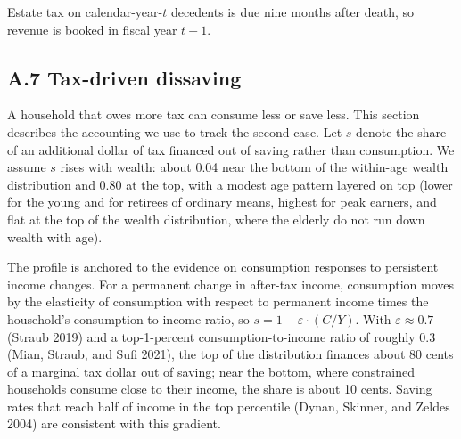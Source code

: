 \documentclass[10pt,twocolumn]{article}
\begin{document}
Estate tax on calendar-year-$t$ decedents is due nine months after
death, so revenue is booked in fiscal year $t+1$.

\subsection*{A.7 Tax-driven dissaving}

A household that owes more tax can consume less or save less. This section
describes the accounting we use to track the second case. Let $s$ denote the
share of an additional dollar of tax financed out of saving rather than
consumption. We assume $s$ rises with wealth: about 0.04 near
the bottom of the within-age wealth distribution and 0.80 at the top, with a modest age
pattern layered on top (lower for the young and for retirees of ordinary
means, highest for peak earners, and flat at the top of the wealth
distribution, where the elderly do not run down wealth with age).

The profile is anchored to the evidence on consumption responses to persistent
income changes. For a permanent change in after-tax income, consumption moves
by the elasticity of consumption with respect to permanent income times the
household's consumption-to-income ratio, so $s = 1 - \varepsilon \cdot (C/Y)$.
With $\varepsilon \approx 0.7$ (Straub 2019) and a top-1-percent
consumption-to-income ratio of roughly 0.3 (Mian, Straub, and Sufi 2021), the
top of the distribution finances about 80 cents of a marginal tax dollar out
of saving; near the bottom, where constrained households consume close to
their income, the share is about 10 cents. Saving rates that reach half of
income in the top percentile (Dynan, Skinner, and Zeldes 2004) are consistent
with this gradient.
\end{document}
